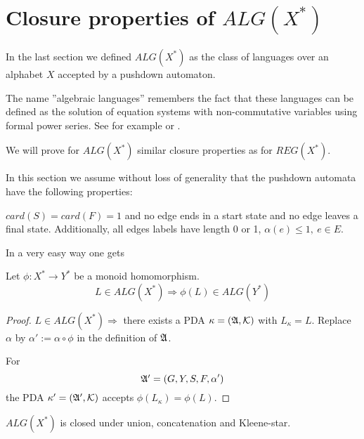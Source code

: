 \section{Closure properties of $ALG(X^*)$}

In the last section we defined $ALG(X^*)$ as the class of languages over an
alphabet $X$ accepted by a pushdown automaton.

The name ''algebraic languages'' remembers the fact that these languages can be
defined as the solution of equation systems with non-commutative variables using
formal power series. See for example \cite{SaSo} or \cite{Berstel77}.

We will prove for $ALG(X^*)$ similar closure properties as for $REG(X^*)$.

In this section we assume without loss of generality that the pushdown automata
have the following properties:

$card(S) = card(F) = 1$ and no edge ends in a start state and no edge leaves a
final state. Additionally, all edges labels have length 0 or 1, $\alpha(e) \leq
1,\ e \in E$.

In a very easy way one gets

\begin{theorem}
\label{alg-lang-closure-hom}
Let $\phi : X^* \to Y^*$ be a monoid homomorphism.
\[ L \in ALG(X^*) \Rightarrow \phi(L) \in ALG(Y^*) \]
\end{theorem} 

\begin{proof}
$L \in ALG(X^*) \Rightarrow$ there exists a PDA $\kappa = (\mbox{$\mathfrak{A}$}, \mbox{$\mathcal{K}$})$
with $L_{\kappa} = L$. Replace $\alpha$ by $\alpha' := \alpha \circ \phi$ in
the definition of $\mbox{$\mathfrak{A}$}$. 

For
\[ \mbox{$\mathfrak{A'}$} = (G, Y, S, F, \alpha') \]
the PDA $\kappa' = (\mbox{$\mathfrak{A'}$}, \mbox{$\mathcal{K}$})$ accepts $\phi(L_{\kappa}) = \phi(L)$.
\end{proof}


\bigskip
\begin{theorem}
$ALG(X^*)$ is closed under union, concatenation and Kleene-star.
\end{theorem}

